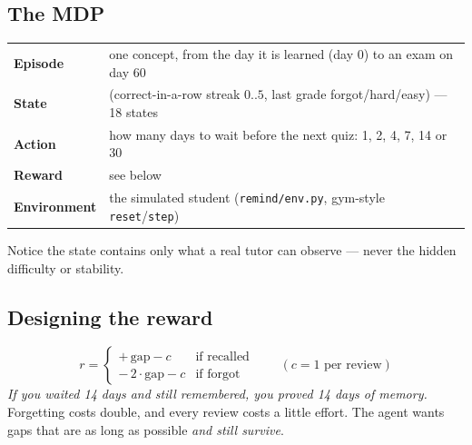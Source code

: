 \subsection{The MDP}
\begin{center}
\renewcommand{\arraystretch}{1.2}
\begin{tabular}{@{}p{3cm}p{11cm}@{}}
\toprule
\textbf{Episode} & one concept, from the day it is learned (day 0) to an exam on day 60\\
\textbf{State} & (correct-in-a-row streak $0..5$, last grade forgot/hard/easy) --- 18 states\\
\textbf{Action} & how many days to wait before the next quiz: 1, 2, 4, 7, 14 or 30\\
\textbf{Reward} & see below\\
\textbf{Environment} & the simulated student (\texttt{remind/env.py}, gym-style \texttt{reset}/\texttt{step})\\
\bottomrule
\end{tabular}
\end{center}
Notice the state contains only what a real tutor can observe --- never the hidden difficulty or stability.

\subsection{Designing the reward}
\[ r = \begin{cases} +\,\text{gap} - c & \text{if recalled} \\ -\,2\cdot\text{gap} - c & \text{if forgot} \end{cases} \qquad (c = 1 \text{ per review}) \]
\emph{If you waited 14 days and still remembered, you proved 14 days of memory.} Forgetting costs double, and every
review costs a little effort. The agent wants gaps that are as long as possible \emph{and still survive}.

